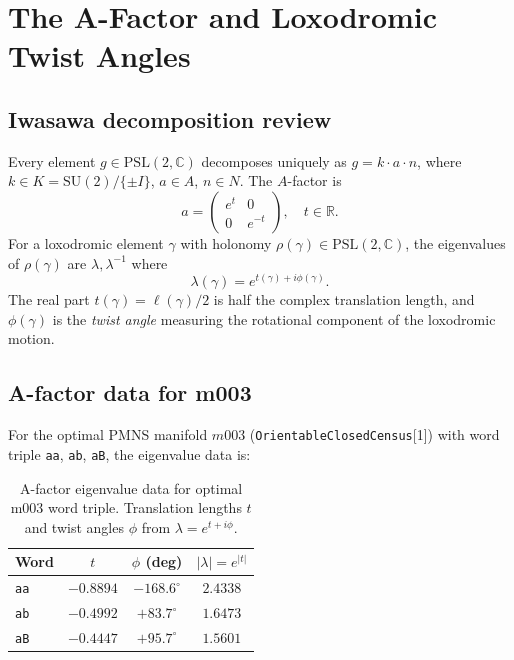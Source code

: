 \documentclass[floatfix,aps,prd,twocolumn,showpacs,superscriptaddress,longbibliography]{revtex4-2}
\newcommand{\PSL}{\mathrm{PSL}(2,\mathbb{C})}
\newcommand{\SUtwo}{\mathrm{SU}(2)}
\begin{document}
\section{The A-Factor and Loxodromic Twist Angles}
\label{sec:afactor}

\subsection{Iwasawa decomposition review}

Every element $g \in \PSL$ decomposes uniquely as $g = k \cdot a \cdot n$,
where $k \in K = \SUtwo/\{\pm I\}$, $a \in A$, $n \in N$.
The $A$-factor is
\begin{equation}
a = \begin{pmatrix} e^t & 0 \\ 0 & e^{-t} \end{pmatrix}, \quad t \in \mathbb{R}.
\end{equation}
For a loxodromic element $\gamma$ with holonomy $\rho(\gamma) \in \PSL$,
the eigenvalues of $\rho(\gamma)$ are $\lambda, \lambda^{-1}$ where
\begin{equation}
\lambda(\gamma) = e^{t(\gamma) + i\phi(\gamma)}.
\label{eq:eigenvalue}
\end{equation}
The real part $t(\gamma) = \ell(\gamma)/2$ is half the complex
translation length, and $\phi(\gamma)$ is the \emph{twist angle}
measuring the rotational component of the loxodromic motion.

\subsection{A-factor data for m003}

For the optimal PMNS manifold $m003$
(\texttt{OrientableClosedCensus}[1]) with word triple
\texttt{aa}, \texttt{ab}, \texttt{aB}, the eigenvalue data is:

\begin{table}[h]
\centering
\caption{A-factor eigenvalue data for optimal m003 word triple.
Translation lengths $t$ and twist angles $\phi$ from
$\lambda = e^{t+i\phi}$.}
\label{tab:afactor}
\begin{tabular}{lccc}
\toprule
Word & $t$ & $\phi$ (deg) & $|\lambda| = e^{|t|}$ \\
\midrule
\texttt{aa} & $-0.8894$ & $-168.6^\circ$ & $2.4338$ \\
\texttt{ab} & $-0.4992$ & $+83.7^\circ$ & $1.6473$ \\
\texttt{aB} & $-0.4447$ & $+95.7^\circ$ & $1.5601$ \\
\bottomrule
\end{tabular}
\end{table}
\end{document}
